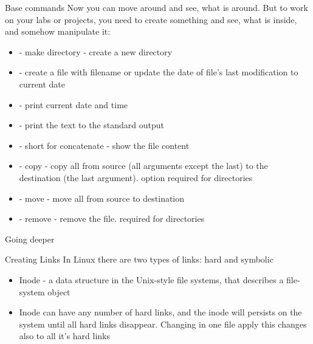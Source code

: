 \documentclass[usenames,dvipsnames,10pt,aspectratio=169]{beamer}
\begin{document}
\begin{frame}{Base commands}
    Now you can move around and see, what is around. But to work on your labs or projects, you need to create something and see, what is inside, and somehow manipulate it: \newline
    \begin{itemize}
        \item {} - make directory - create a new directory
        \item {} - create a file with filename or update the date of file's last modification to current date
        \item {} - print current date and time
        \item {} - print the text to the standard output
        \item {} - short for concatenate - show the file content
        \item {} - copy - copy all from source (all arguments except the last) to the destination (the last argument).  option required for directories
        \item {} - move - move all from source to destination
        \item {} - remove - remove the file.  required for directories
    \end{itemize}
\end{frame}

\begin{frame}{Going deeper}

    {\Large Creating Links} \newline
    In Linux there are two types of links: hard and symbolic
    \begin{itemize}
        \item Inode - a data structure in the Unix-style file systems, that describes a file-system object
        \item Inode can have any number of hard links, and the inode will persists on the system until all hard links disappear. Changing in one file apply this changes also to all it's hard links
    \end{itemize}
\end{frame}
\end{document}
